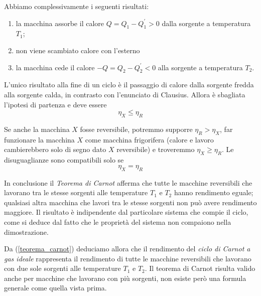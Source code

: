 \documentclass[class=book, crop=false, oneside, 12pt]{standalone}
\begin{document}
Abbiamo complessivamente i seguenti risultati:
\begin{enumerate}
    \item la macchina assorbe il calore \(Q = Q_1 -Q_1^{\prime}> 0\) dalla sorgente a temperatura \(T_1\);
    \item non viene scambiato calore con l'esterno
    \item la macchina cede il calore \(-Q = Q_2 - Q_2^{\prime} < 0 \) alla sorgente a temperatura \(T_2\).
\end{enumerate} 
L'unico risultato alla fine di un ciclo è il passaggio di calore dalla sorgente fredda alla sorgente calda, in contrasto con l'enunciato di Clausius. 
Allora è sbagliata l'ipotesi di partenza e deve essere
\begin{equation}
    \eta_X \leq \eta_R
\end{equation}

Se anche la macchina \(X\) fosse reversibile, potremmo supporre \(\eta_R > \eta_X\), far funzionare la macchina \(X\) come macchina frigorifera (calore e lavoro cambierebbero solo di segno dato \(X\) reversibile)
e troveremmo \(\eta_X \geq \eta_R\).
Le disuguaglianze sono compatibili solo se
\begin{equation} \label{teorema_carnot}
    \eta_X = \eta_R
\end{equation}

In conclusione il \emph{Teorema di Carnot} afferma che tutte le macchine reversibili che lavorano tra le stesse sorgenti alle temperature \(T_1\) e \(T_2\) hanno rendimento eguale; qualsiasi altra macchina che lavori tra le stesse sorgenti non può avere rendimento maggiore. 
Il risultato è indipendente dal particolare sistema che compie il ciclo, come si deduce dal fatto che le proprietà del sistema non compaiono nella dimostrazione.

Da (\ref{teorema_carnot}) deduciamo allora che il rendimento del \emph{ciclo di Carnot a gas ideale} rappresenta il rendimento di tutte le macchine reversibili che lavorano con due sole sorgenti alle temperature \(T_1\) e \(T_2\).
Il teorema di Carnot risulta valido anche per macchine che lavorano con più sorgenti, non esiste però una formula generale come quella vista prima.
\end{document}
